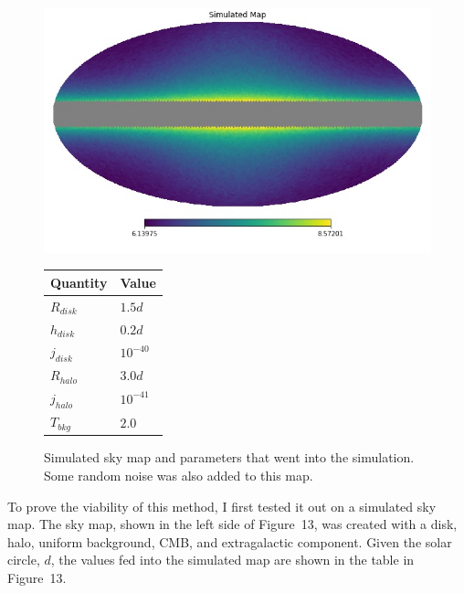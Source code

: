 \documentclass[letterpaper, 10pt]{article}
\begin{document}
\begin{figure}[h]
\begin{minipage}{.5\textwidth}
\centering
\includegraphics[height=0.75\textwidth]{simulated_map.jpg}
\end{minipage}%
\begin{minipage}{0.5\textwidth}
\centering

\hfill


\renewcommand{\arraystretch}{1.5}
\begin{tabular}{|>{\centering\arraybackslash}m{1.75cm}|>{\centering\arraybackslash}m{1.75cm}|}
\hline
Quantity & Value \\
\hline
$R_{disk}$ & $1.5d$ \\
\hline
$h_{disk}$ & $0.2d$ \\
\hline
$j_{disk}$ & $10^{-40}$ \\
\hline
$R_{halo}$ & $3.0d$ \\
\hline
$j_{halo}$ & $10^{-41}$ \\
\hline
$T_{bkg}$ & $2.0$ \\
\hline

\end{tabular}
\renewcommand{\arraystretch}{1}
\end{minipage}

\caption{Simulated sky map and parameters that went into the simulation. Some random noise was also added to this map.}
\end{figure}


To prove the viability of this method, I first tested it out on a simulated sky map. The sky map, shown in the left side of Figure~13, was created with a disk, halo, uniform background, CMB, and extragalactic component. Given the solar circle, $d$, the values fed into the simulated map are shown in the table in Figure~13. 
\end{document}
